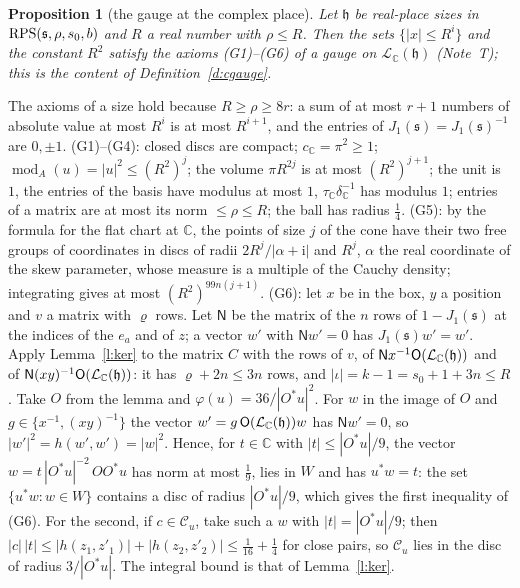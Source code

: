\documentclass[11pt,a4paper]{article}
\makeatletter
\theoremstyle{plainx}
\newtheorem{proposition}[theorem]{Proposition}
\theoremstyle{uprightx}
\renewenvironment{proof}[1][Proof]{\par\pushQED{\qed}\normalfont\topsep0pt\partopsep0pt
  \trivlist\item[\hskip\labelsep\itshape #1.]\ignorespaces}{\popQED\endtrivlist\@endpefalse}
\newcommand{\CC}{\mathbb{C}}
\newcommand{\modA}{\operatorname{mod}_A}
\newcommand{\cLC}[1]{\mathcal{L}_{\CC}(#1)}
\newcommand{\Jone}[1]{J_1(#1)}
\makeatother
\begin{document}
\begin{proposition}[the gauge at the complex place]\label{p:gauge}
Let $\mathfrak{h}$ be real-place sizes in $\operatorname{RPS}(\mathfrak{s},\rho,s_0,b)$ and $R$ a real number with
$\rho\le R$. Then the sets $\{|x|\le R^{i}\}$ and the constant $R^{2}$ satisfy the axioms \textup{(G1)--(G6)} of a
gauge on $\cLC{\mathfrak{h}}$ (Note~T); this is the content of Definition~\ref{d:cgauge}.
\end{proposition}
\begin{proof}
The axioms of a size hold because $R\ge\rho\ge8r$: a sum of at most $r+1$ numbers of absolute value at most $R^{i}$
is at most $R^{i+1}$, and the entries of $\Jone{\mathfrak{s}}=\Jone{\mathfrak{s}}^{-1}$ are $0,\pm1$. (G1)--(G4):
closed discs are compact; $c_{\CC}=\pi^{2}\ge1$; $\modA(u)=|u|^{2}\le(R^{2})^{j}$; the volume $\pi R^{2j}$ is at most
$(R^{2})^{j+1}$; the unit is $1$, the entries of the basis have modulus at most $1$, $\tau_{\CC}\delta_{\CC}^{-1}$
has modulus $1$; entries of a matrix are at most its norm $\le\rho\le R$; the ball has radius $\tfrac14$. (G5):
by the formula for the flat chart at $\CC$, the points of size $j$ of the cone have their two free groups of
coordinates in discs of radii $2R^{j}/|\alpha+\mathrm{i}|$ and $R^{j}$, $\alpha$ the real coordinate of the skew
parameter, whose measure is a multiple of the Cauchy density; integrating gives at most $(R^{2})^{99n(j+1)}$.
(G6): let $x$ be in the box, $y$ a position and $v$ a matrix with $\varrho$ rows. Let $\mathsf{N}$ be the matrix of
the $n$ rows of $1-\Jone{\mathfrak{s}}$ at the indices of the $e_a$ and of $z$; a vector $w'$ with $\mathsf{N}w'=0$
has $\Jone{\mathfrak{s}}w'=w'$. Apply Lemma~\ref{l:ker} to the matrix $C$ with the rows of $v$, of
$\mathsf{N}x^{-1}\orthonormalPart{\cLC{\mathfrak{h}}}$ and of $\mathsf{N}(xy)^{-1}\orthonormalPart{\cLC{\mathfrak{h}}}$:
it has $\varrho+2n\le3n$ rows, and $|\iota|=k-1=s_0+1+3n\le R$. Take $O$ from the lemma and
$\varphi(u)=36/|O^{*}u|^{2}$. For $w$ in the image of $O$ and $g\in\{x^{-1},(xy)^{-1}\}$ the vector
$w'=g\,\orthonormalPart{\cLC{\mathfrak{h}}}w$ has $\mathsf{N}w'=0$, so $|w'|^{2}=h(w',w')=|w|^{2}$. Hence, for
$t\in\CC$ with $|t|\le|O^{*}u|/9$, the vector $w=t\,|O^{*}u|^{-2}\,OO^{*}u$ has norm at most $\tfrac19$, lies in $W$
and has $u^{*}w=t$: the set $\{u^{*}w:w\in W\}$ contains a disc of radius $|O^{*}u|/9$, which gives the first
inequality of (G6). For the second, if $c\in\mathcal{C}_u$, take such a $w$ with $|t|=|O^{*}u|/9$; then
$|c|\,|t|\le|h(z_1,z'_1)|+|h(z_2,z'_2)|\le\tfrac1{16}+\tfrac14$ for close pairs, so $\mathcal{C}_u$ lies in the disc
of radius $3/|O^{*}u|$. The integral bound is that of Lemma~\ref{l:ker}.
\end{proof}
\end{document}
